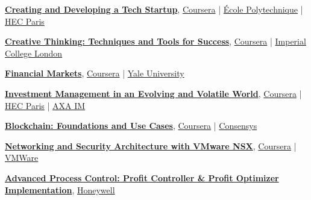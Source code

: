 \documentclass[a4paper,11pt]{article}
\begin{document}
	\vspace{0.1cm}
	
	\href{https://www.coursera.org/account/accomplishments/certificate/GRZFUUXBLNDN}{\textbf{Creating and Developing a Tech Startup}}, \href{https://www.coursera.org/}{Coursera} | \href{https://www.polytechnique.edu/}{\'{E}cole Polytechnique} | \href{https://www.hec.edu/}{HEC Paris}
	
	\vspace{0.1cm}
	
	\href{https://www.coursera.org/account/accomplishments/certificate/MF6SH48HP9Z6}{\textbf{Creative Thinking: Techniques and Tools for Success}}, \href{https://www.coursera.org/}{Coursera} | \href{https://www.imperial.ac.uk/}{Imperial College London}
	
	\vspace{0.1cm}
	
	\href{https://www.coursera.org/account/accomplishments/certificate/HMAFBFWKTPLQ}{\textbf{Financial Markets}}, \href{https://www.coursera.org/}{Coursera} | \href{https://www.yale.edu/}{Yale University}
	
	\vspace{0.1cm}
	
	\href{https://www.coursera.org/account/accomplishments/certificate/NDW9NP2VQ3CK}{\textbf{Investment Management in an Evolving and Volatile World}}, \href{https://www.coursera.org/}{Coursera} | \href{https://www.hec.edu/}{HEC Paris} | \href{https://www.axa-im.com/}{AXA IM}
	
	\vspace{0.1cm}
	
	\href{https://www.coursera.org/account/accomplishments/certificate/WRN2XY9JFSB2}{\textbf{Blockchain: Foundations and Use Cases}}, \href{https://www.coursera.org/}{Coursera} | \href{https://consensys.net/}{Consensys}
	
	\vspace{0.1cm}
	
	\href{https://www.coursera.org/account/accomplishments/certificate/9ZM7APA2982L}{\textbf{Networking and Security Architecture with VMware NSX}}, \href{https://www.coursera.org/}{Coursera} | \href{https://www.vmware.com/}{VMWare}
	
	\vspace{0.1cm}
	
	\href{https://trinhvanvuong.github.io/pdf/APC-0001-VILT_R500.pdf}{\textbf{Advanced Process Control: Profit Controller \& Profit Optimizer Implementation}}, \href{https://www.honeywellprocess.com/}{Honeywell}
	
\end{document}

